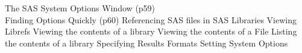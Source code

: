 The SAS System Options Window (p59)\\
Finding Options Quickly (p60)
         Referencing SAS files in SAS Libraries
         Viewing Librefs
         Viewing the contents of a library
         Viewing the contents of a File
         Listing the contents of a library
         Specifying Results Formats
         Setting System Options


